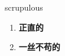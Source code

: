 
\begin{frame}
{\huge scrupulous}
\begin{center}
\begin{enumerate}\Large
  \item \textbf{正直的}
  \item \textbf{一丝不苟的}
\end{enumerate}
\end{center}
\end{frame}
